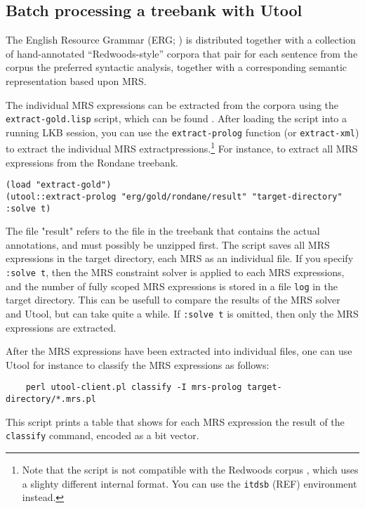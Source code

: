 \subsection{Batch processing a treebank with Utool}

The English Resource Grammar (ERG; ) is distributed together
with a collection of hand-annotated ``Redwoods-style'' corpora that pair for
each sentence from the corpus the preferred syntactic analysis, together with
a corresponding semantic representation based upon MRS. 

The individual MRS expressions can be extracted from the corpora using the
\verb|extract-gold.lisp| script, which can be found . After
loading the script into a running LKB session, you can use the
\verb|extract-prolog| function (or \verb|extract-xml|) to extract the
individual MRS extractpressions.\footnote{Note that the script is not
compatible with the Redwoods corpus \cite{something}, which uses a slighty
different internal format. You can use the \texttt{itdsb} (REF) environment
instead.} For instance, to extract all MRS expressions from the Rondane
treebank.

\begin{verbatim}
(load "extract-gold")
(utool::extract-prolog "erg/gold/rondane/result" "target-directory" :solve t)
\end{verbatim}

The file "result" refers to the file in the treebank that contains the actual
annotations, and must possibly be unzipped first. The script saves all MRS
expressions in the target directory, each MRS as an individual file. If you
specify \verb|:solve t|, then the MRS constraint solver is applied to each
MRS expressions, and the number of fully scoped MRS expressions is stored in
a file \verb|log| in the target directory. This can be usefull to compare the
results of the MRS solver and Utool, but can take quite a while. If
\verb|:solve t| is omitted, then only the MRS expressions are extracted.

After the MRS expressions have been extracted into individual files, one can
use Utool for instance to classify the MRS expressions as follows:
\begin{verbatim}
	perl utool-client.pl classify -I mrs-prolog target-directory/*.mrs.pl 
\end{verbatim} 

This script prints a table that shows for each MRS expression the result of
the \verb|classify| command, encoded as a bit vector.





